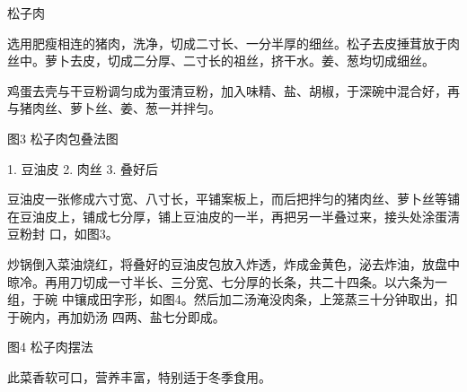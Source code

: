 \begin{recipe}{松子肉}

\ingredients


\preparation

\step 选用肥瘦相连的猪肉，洗净，切成二寸长、一分半厚的细丝。松子去皮捶茸放于肉
丝中。萝卜去皮，切成二分厚、二寸长的祖丝，挤干水。姜、葱均切成细丝。

\step 鸡蛋去壳与干豆粉调匀成为蛋清豆粉，加入味精、盐、胡椒，于深碗中混合好，再
与猪肉丝、萝卜丝、姜、葱一并拌匀。

图3 松子肉包叠法图

1. 豆油皮 2. 肉丝 3. 叠好后

\step 豆油皮一张修成六寸宽、八寸长，平铺案板上，而后把拌匀的猪肉丝、萝卜丝等铺
在豆油皮上，铺成七分厚，铺上豆油皮的一半，再把另一半叠过来，接头处涂蛋淸豆粉封
口，如图3。

\step 炒锅倒入菜油烧红，将叠好的豆油皮包放入炸透，炸成金黄色，泌去炸油，放盘中
晾冷。再用刀切成一寸半长、三分宽、七分厚的长条，共二十四条。以六条为一组，于碗
中镶成田字形，如图4。然后加二汤淹没肉条，上笼蒸三十分钟取出，扣于碗内，再加奶汤
四两、盐七分即成。

图4 松子肉摆法

\features

此菜香软可口，营养丰富，特别适于冬季食用。

\end{recipe}

